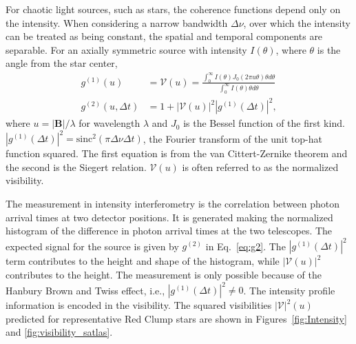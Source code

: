 \documentclass[linenumbers,trackchanges,margins]{aastex701}
\begin{document}
For chaotic light sources, such as stars, the coherence functions
depend only on the intensity.  When considering a narrow bandwidth $\Delta \nu$, over which
the intensity can be treated as being constant, the spatial and temporal components are separable.
For an axially symmetric source with
intensity $I(\theta)$, where $\theta$ is the angle from the star center,
\begin{align}
    g^{(1)}(u) & = \mathcal{V}(u) = \frac{ \int_0^\infty{I(\theta) J_0(2 \pi u\theta) \theta d\theta}}
    {\int_0^\infty{I(\theta)\theta d\theta}} \\
    g^{(2)}(u, \Delta t) & = 1 + |\mathcal{V}(u)|^2 |g^{(1)}(\Delta t)|^2, \label{eq:g2}
\end{align}
where $u=|\mathbf{B}|/\lambda$ for wavelength
$\lambda$
and $J_0$ is the Bessel function of the first kind.
$|g^{(1)}(\Delta t)|^2 = \text{sinc}^2{(\pi\Delta\nu \Delta t)}$, the Fourier transform
of the unit top-hat function squared.
The first equation is from the van Cittert-Zernike theorem and the second is the Siegert relation.  $\mathcal{V}(u)$ is often referred to as the normalized visibility.


The measurement in intensity interferometry is the correlation between photon arrival times at two detector positions.  It is generated  making the normalized histogram of the difference in photon arrival times at the two telescopes.  The expected signal for
the source is given by $g^{(2)}$ in Eq.~\ref{eq:g2}.   The $|g^{(1)}(\Delta t)|^2$ term contributes to the height and shape of the histogram, while $|\mathcal{V}(u)|^2$ contributes to the height. 
The measurement is only possible because of the Hanbury Brown and
Twiss effect, i.e., $|g^{(1)}(\Delta t)|^2 \ne 0$.
The intensity profile information is encoded in the visibility.
The squared visibilities $|\mathcal{V}|^2(u) $ predicted for representative Red Clump stars are shown in Figures~\ref{fig:Intensity} and \ref{fig:visibility_satlas}.
\end{document}
